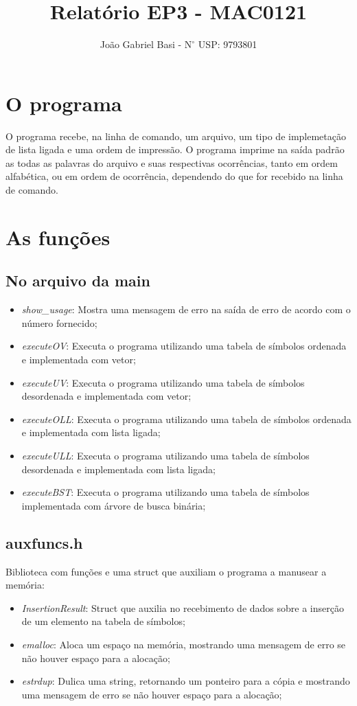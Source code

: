 \documentclass[12pt, a4paper]{article} %
\title{Relatório EP3 - MAC0121}
\date{}
\author{João Gabriel Basi - $\text{N}^\circ$ USP: 9793801}
\begin{document}
\maketitle
\section{O programa}
O programa recebe, na linha de comando, um arquivo, um tipo de implemetação de lista ligada e uma ordem de impressão. O programa imprime na saída padrão as todas as palavras do arquivo e suas respectivas ocorrências, tanto em ordem alfabética, ou em ordem de ocorrência, dependendo do que for recebido na linha de comando.

\section{As funções}
	\subsection{No arquivo da main}
	\begin{itemize}
		\item \textit{show\_usage}: Mostra uma mensagem de erro na saída de erro de acordo com o número fornecido;
		\item \textit{executeOV}: Executa o programa utilizando uma tabela de símbolos ordenada e implementada com vetor;
		\item \textit{executeUV}: Executa o programa utilizando uma tabela de símbolos desordenada e implementada com vetor;
		\item \textit{executeOLL}: Executa o programa utilizando uma tabela de símbolos ordenada e implementada com lista ligada;
		\item \textit{executeULL}: Executa o programa utilizando uma tabela de símbolos desordenada e implementada com lista ligada;
		\item \textit{executeBST}: Executa o programa utilizando uma tabela de símbolos implementada com árvore de busca binária;
	\end{itemize}

	\subsection{auxfuncs.h}
	Biblioteca com funções e uma struct que auxiliam o programa a manusear a memória:
	\begin{itemize}
		\item \textit{InsertionResult}: Struct que auxilia no recebimento de dados sobre a inserção de um elemento na tabela de símbolos;
		\item \textit{emalloc}: Aloca um espaço na memória, mostrando uma mensagem de erro se não houver espaço para a alocação;
		\item \textit{estrdup}: Dulica uma string, retornando um ponteiro para a cópia e mostrando uma mensagem de erro se não houver espaço para a alocação;
	\end{itemize}
\end{document}
